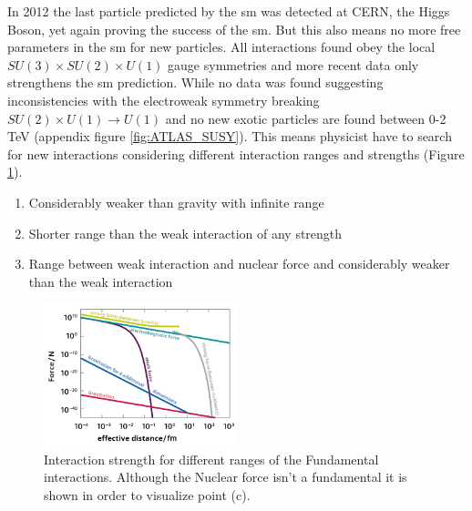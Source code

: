 \documentclass[../Bachelorarbeit.tex]{subfiles}
\begin{document}
\label{sec:BSM}
In 2012 the last particle predicted by the \acrshort{sm} was detected at CERN, the Higgs Boson, yet again proving the success of the \acrshort{sm}.
But this also means no more free parameters in the \acrshort{sm} for new particles. All interactions found obey the local $SU(3) \times SU(2) \times U(1)$ gauge symmetries \cite{AdamFalkowski.29.09.2015}
and more recent data only strengthens the \acrshort{sm} prediction. While no data was found suggesting inconsistencies with the electroweak symmetry breaking $SU(2) \times U(1) \rightarrow U(1)$
and no new exotic particles are found between 0-2 TeV (appendix figure \ref{fig:ATLAS_SUSY}).
This means physicist have to search for new interactions considering different interaction ranges and strengths (Figure \ref{fig:WW_range}).
\begin{enumerate}[label=(\alph*)]
    \item Considerably weaker than gravity with infinite range
    \item Shorter range than the weak interaction of any strength
    \item Range between weak interaction and nuclear force and considerably weaker than the weak interaction
\end{enumerate}

\begin{figure}[h]
    \centering
    \includegraphics[width=0.5\textwidth]{images/Teilchenwet_WW_range.png}
    \caption{Interaction strength for different ranges of the Fundamental interactions. Although the Nuclear force isn't a fundamental it is shown in order to visualize point (c).  \cite{Teilchenwelt} }
    \label{fig:WW_range}
\end{figure}
\end{document}
